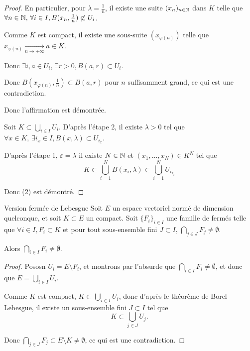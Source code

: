\begin{proof}
    En particulier, pour $\lambda = \frac{1}{n}$, il existe une suite $(x_n)_{n \in \mathbb{N}}$ dans $K$ telle que
    $\forall n \in \mathbb{N}, \, \forall i \in I, B(x_n, \frac{1}{n}) \not\subset U_i$.

    Comme $K$ est compact, il existe une sous-suite $(x_{\varphi(n)})$ telle que $x_{\varphi(n)} \xrightarrow[n \to + \infty]{} a \in K$. 

    Donc $\exists i, a \in U_i$, $\exists r > 0, B(a, r) \subset U_i$.

    Donc $B(x_{\varphi(n)}, \frac{1}{n}) \subset B(a, r)$ pour $n$ suffisamment grand, ce qui est une contradiction.

    Donc l'affirmation est démontrée.


    Soit $K \subset \bigcup_{i \in I} U_i$. D'après l'étape 2, il existe $\lambda > 0$ tel que
    $\forall x \in K, \, \exists i_x \in I, B(x, \lambda) \subset U_{i_x}$.

    D'après l'étape 1, $\varepsilon = \lambda$ il existe $N \in \mathbb{N}$ et $(x_1, \ldots, x_N) \in K^N$ tel que
    \[
        K \subset \bigcup_{i=1}^N B(x_i, \lambda) \subset \bigcup_{i=1}^N U_{i_{x_i}}
    \]

    Donc (2) est démontré.

\end{proof}

\begin{theoreme}{Version fermée de Lebesgue}{}
    Soit $E$ un espace vectoriel normé de dimension quelconque, et soit $K \subset E$ un compact.
    Soit $\{F_i\}_{i \in I}$ une famille de fermés telle que $\forall i \in I, F_i \subset K$ et 
    pour tout sous-ensemble fini $J \subset I$, $\displaystyle \bigcap_{j \in J} F_j \neq \emptyset$.

    Alors $\displaystyle \bigcap_{i \in I} F_i \neq \emptyset$.
    
\end{theoreme}

\begin{proof}
    Pososn $U_i = E \setminus F_i$, et montrons par l'absurde que $\bigcap_{i \in I} F_i \neq \emptyset$, et donc 
    que $\displaystyle E = \bigcup_{i \in I} U_i$.

    Comme $K$ est compact, $K \subset \bigcup_{i \in I} U_i$, donc d'après le théorème de Borel Lebesgue, 
    il existe un sous-ensemble fini $J \subset I$ tel que
    \[
        K \subset \bigcup_{j \in J} U_j.
    \]

    Donc $\displaystyle \bigcap_{j \in J} F_j \subset E \setminus K \neq \emptyset$, ce qui est une contradiction.
\end{proof}

